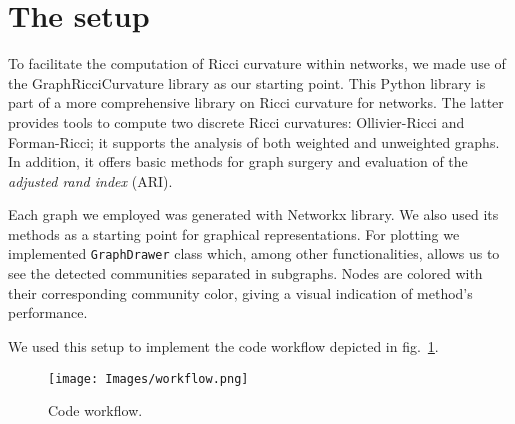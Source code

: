 \section{The setup}
\label{sec5.1}
To facilitate the computation of Ricci curvature within networks, we made use of the GraphRicciCurvature library as our starting point. This Python library is part of a more comprehensive library on Ricci curvature for networks. The latter provides tools to compute two discrete Ricci curvatures: Ollivier-Ricci and Forman-Ricci; it supports the analysis of both weighted and unweighted graphs. In addition, it offers basic methods for graph surgery and evaluation of the \textit{adjusted rand index} (ARI).

Each graph we employed was generated with Networkx library. We also used its methods as a starting point for graphical representations.
For plotting we implemented \texttt{GraphDrawer} class which, among other functionalities, allows us to see the detected communities separated in subgraphs. Nodes are colored with their corresponding community color, giving a visual indication of method's performance. 

We used this setup to implement the code workflow depicted in fig.~\ref{fig:workflow}.

\begin{figure}
    \centering
    \texttt{[image: Images/workflow.png]}
    \caption{Code workflow.}
    \label{fig:workflow}
\end{figure}